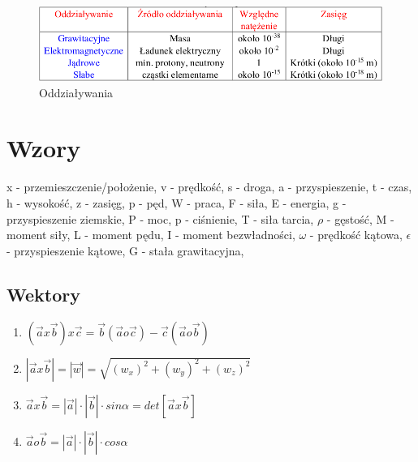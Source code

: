 \documentclass[12pt,twoside,a4paper]{book}
\begin{document}
\begin{center}
\vspace{1cm}
\begin{figure}
\caption{Oddziaływania}
\includegraphics[width=\textwidth]{graphics/6}
\end{figure}
\end{center}

\chapter{Wzory}
\textit\small{{x - przemieszczenie/położenie,  v - prędkość, s - droga, a - przyspieszenie, t - czas, h - wysokość, z - zasięg, p - pęd, W - praca, F - siła, E - energia, g - przyspieszenie ziemskie, P - moc, p - ciśnienie, T - siła tarcia, $\rho$ - gęstość, M - moment siły, L - moment pędu, I - moment bezwładności, $\omega$ - prędkość kątowa, $\epsilon$ - przyspieszenie kątowe, G - stała grawitacyjna, }}
\section{Wektory}
\begin{enumerate}
\item$(\overrightarrow{a}x\overrightarrow{b})x\overrightarrow{c}=\overrightarrow{b}(\overrightarrow{a}o\overrightarrow{c})-\overrightarrow{c}(\overrightarrow{a}o\overrightarrow{b})$
\item$|\overrightarrow{a}x\overrightarrow{b}|=|\overrightarrow{w}|=\sqrt{(w_{x})^2+(w_{y})^2+(w_{z})^2}$
\item$\overrightarrow{a}x\overrightarrow{b}=|\overrightarrow{a}|\cdot|\overrightarrow{b}|\cdot sin\alpha=det[\overrightarrow{a}x\overrightarrow{b}]$
\item$\overrightarrow{a}o\overrightarrow{b}=|\overrightarrow{a}|\cdot|\overrightarrow{b}|\cdot cos\alpha$
\end{enumerate}
\end{document}
